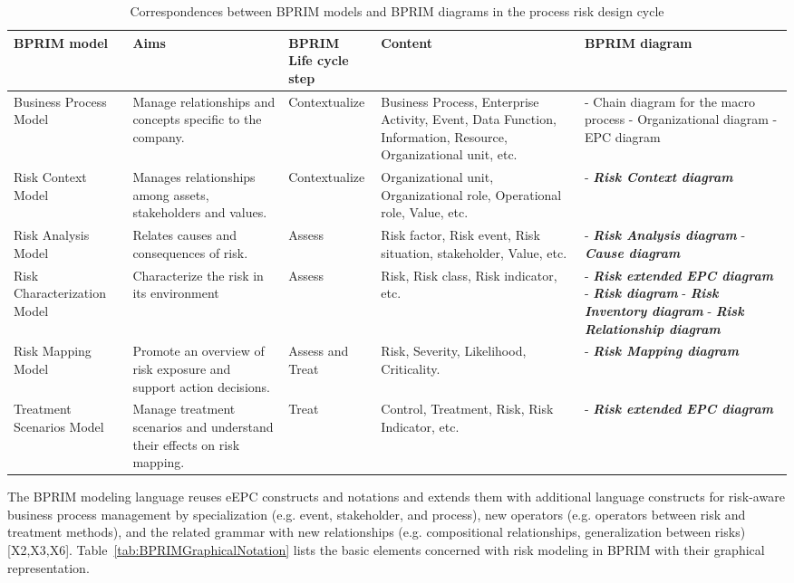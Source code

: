 \documentclass[preprint,3p,times,number]{elsarticle}
\begin{document}
\begin{table}[h!]
	\centering
	\small
	\begin{tabularx}{\linewidth}{>{\raggedright}p{2.2cm}>{\raggedright}X>{\raggedright}p{2.2cm}>{\raggedright}X>{\raggedright}X}
\textbf{BPRIM model}  & \textbf{Aims} & \textbf{BPRIM\\Life cycle step} & \textbf{Content} & \textbf{BPRIM diagram} \tabularnewline 
\toprule
Business Process Model & Manage relationships and concepts specific to the company. & Contextualize & Business Process, Enterprise Activity, Event, Data Function, Information, Resource, Organizational unit, etc. &- Chain diagram for the macro process \newline 
- Organizational diagram \newline
- EPC diagram \tabularnewline 
\midrule 
Risk Context Model & Manages relationships among assets, stakeholders and values. & Contextualize & Organizational unit, Organizational role, Operational role, Value, etc. & - \textbf{\emph{Risk Context diagram}} \tabularnewline 
\midrule
Risk Analysis Model & Relates causes and consequences of risk. & Assess & Risk factor, Risk event, Risk situation, stakeholder, Value, etc. & - \textbf{\emph{Risk Analysis diagram}}\newline
- \textbf{\emph{Cause diagram}}\tabularnewline 
\midrule 
Risk Characterization Model & Characterize the risk in its environment & Assess & Risk, Risk class, Risk indicator, etc. & - \textbf{\emph{Risk extended EPC diagram}} \newline 
- \textbf{\emph{Risk diagram}} \newline
- \textbf{\emph{Risk Inventory diagram}} \newline 
- \textbf{\emph{Risk Relationship diagram}} \tabularnewline
\midrule
Risk Mapping Model  & Promote an overview of risk exposure and support action decisions. & Assess and Treat & Risk, Severity, Likelihood, Criticality. & - \textbf{\emph{Risk Mapping diagram}} \tabularnewline 
\midrule
Treatment Scenarios Model  & Manage treatment scenarios and understand their effects on risk mapping. & Treat & Control, Treatment, Risk, Risk Indicator, etc. & - \textbf{\emph{Risk extended EPC diagram}} \tabularnewline 
\bottomrule
\end{tabularx} 
\caption{Correspondences between BPRIM models and BPRIM diagrams in the process risk design cycle}
\label{tab:BPRIMDiagrams}
\end{table}

The BPRIM modeling language reuses eEPC constructs and notations and extends them with additional language constructs for risk-aware business process management by specialization (e.g. event, stakeholder, and process), new operators (e.g. operators between risk and treatment methods), and the related grammar with new relationships (e.g. compositional relationships, generalization between risks) [X2,X3,X6]. %
Table~\ref{tab:BPRIMGraphicalNotation} lists the basic elements concerned with risk modeling in BPRIM with their graphical representation.
\end{document}
